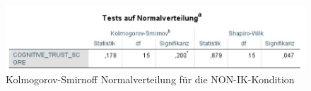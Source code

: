 \documentclass[a4paper,11pt]{article}%
\renewcommand{\\}{\vspace*{0.5\baselineskip} \newline}
\begin{document}
	\begin{figure}[H]
	\centering
		\begin{footnotesize}
			\includegraphics[scale=0.6]{Abbildungen/Post_QuestionnaireStatistiks/Normalverteilung_15_NON_IK}\\
			\caption{Kolmogorov-Smirnoff Normalverteilung für die NON-IK-Kondition}
			\label{fig:KolSmirIndNONIK}
		\end{footnotesize}
	\end{figure}	
	
	
\end{document}
